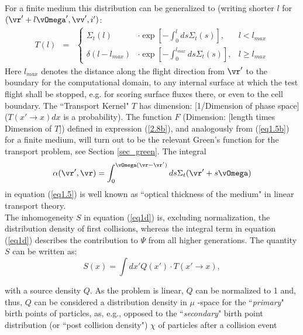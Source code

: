 For a finite medium this distribution can be generalized to (writing shorter $l$ for $(\vr'+l\vOmega',\vv',i')$:
\begin{eqnarray} \label{eq1.5b}
T(l) &=& \left\{
\begin{array}{lcr}
\Sigma_t ( l) & \cdot \exp
\left [   - \int_{0}^{l} ds \Sigma_t ( s
 )  \right ],&  l< l_{max} \\ \delta(l-l_{max}) & \cdot \exp
\left [   - \int_{0}^{l_{max}} ds \Sigma_t (   s
 )  \right ],  & l\ge l_{max}
\end{array}
\right.
\end{eqnarray}
Here $l_{max}$ denotes the distance along the flight direction from $\vr'$ to the boundary for the computational domain,
to any internal surface at which the test flight shall be stopped, e.g. for scoring surface fluxes there,  or even to the cell boundary.
The ``Transport Kernel" $T$ has dimension: [1/Dimension of phase space] ($T(x'\rightarrow x)dx$ is a probability).
The function $F$ (Dimension: [length times Dimension of $T$])
defined in expression (\ref{2.8b}), and analogously from (\ref{eq1.5b})
for a finite medium,  will turn out to be the relevant Green's function
for the transport problem, see Section \ref{sec_green}.
The integral
\begin{displaymath}
\alpha(\vr',\vr) =
\int_{0}^{\vOmega ( \vr - \vr' )}
ds \Sigma_t ( \vr '  +  s \vOmega )
\end{displaymath}
in equation (\ref{eq1.5}) is well known as ``optical thickness of
the medium" in linear transport theory.
\\ The inhomogeneity $S$ in equation (\ref{eq1d}) is, excluding
normalization, the distribution density of first collisions,
whereas the integral term in equation (\ref{eq1d}) describes the
contribution to $\Psi$ from all higher generations. The quantity $S$
can be written as:
\renewcommand{\theequation}{1.6a}
\begin{equation} \label{eq1.6a}
S(x)  =  \int dx '   Q(x ' )  \cdot T(x ' \rightarrow x) ,
\end{equation}
\addtocounter{equation}{-1}
\renewcommand{\theequation}{\arabic{section}.\arabic{equation}}
with a source density $Q$. As the problem is linear, $Q$ can be
normalized to 1 and, thus, $Q$ can be considered a distribution
density in $\mu$ -space for the ``{\sl primary}" birth points of
particles, as, e.g., opposed to the ``{\sl secondary}" birth point
distribution (or ``post collision density") $\chi$ of particles
after a collision event

